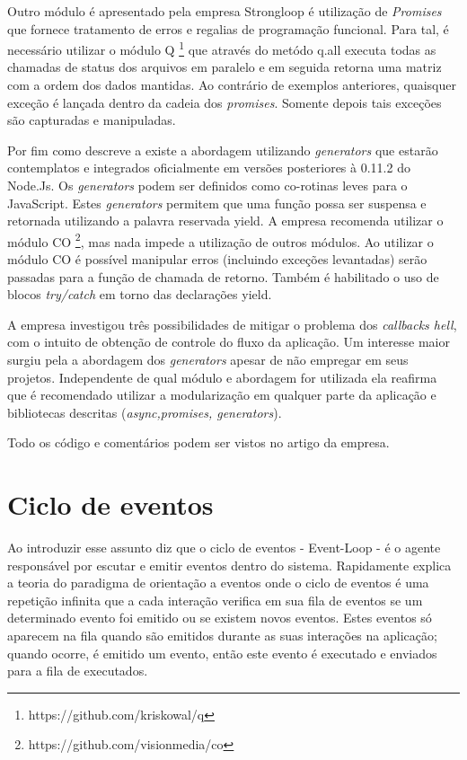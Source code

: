   Outro módulo é apresentado pela empresa Strongloop é utilização de \textit{Promises} que fornece tratamento de erros
  e regalias de programação funcional. Para tal, é necessário utilizar o módulo Q \footnote{https://github.com/kriskowal/q}
  que através do metódo q.all executa todas as chamadas de status dos arquivos em paralelo e em seguida retorna uma matriz
  com a ordem dos dados mantidas. Ao contrário de exemplos anteriores, quaisquer exceção é lançada dentro da cadeia dos
  \textit{promises}. Somente depois tais exceções são capturadas e manipuladas.
  
  Por fim como descreve a  existe a abordagem utilizando \textit{generators} que estarão
  contemplatos e integrados oficialmente em versões posteriores à 0.11.2 do Node.Js. Os \textit{generators} podem ser definidos
  como co-rotinas leves para o JavaScript. Estes \textit{generators} permitem que uma função possa ser suspensa e retornada
  utilizando a palavra reservada yield. A empresa recomenda utilizar o módulo CO \footnote{https://github.com/visionmedia/co},
  mas nada impede a utilização de outros módulos. Ao utilizar o módulo CO é possível manipular erros (incluindo exceções levantadas)
  serão passadas para a função de chamada de retorno. Também é habilitado o uso de blocos \textit{try/catch} em torno das 
  declarações yield.
  
  A empresa \cite{Strongloop:2013} investigou três possibilidades de mitigar o problema dos \textit{callbacks hell}, com o 
  intuito de obtenção de controle do fluxo da aplicação. Um interesse maior surgiu pela a abordagem dos \textit{generators}
  apesar de não empregar em seus projetos. Independente de qual módulo e abordagem for utilizada ela reafirma que é recomendado
  utilizar a modularização em qualquer parte da aplicação e bibliotecas descritas (\textit{async,promises, generators}).
  
  Todo os código e comentários podem ser vistos no artigo da empresa. \cite{Strongloop:2013}
  
\section{Ciclo de eventos}
\label{ciclo-de-eventos}
  
  Ao introduzir esse assunto \cite{Pereira:2013} diz que o ciclo de eventos - Event-Loop - 
  é o agente responsável por escutar e emitir eventos dentro do sistema. Rapidamente explica a teoria do paradigma 
  de orientação a eventos onde o ciclo de eventos é uma repetição infinita que a cada interação verifica em sua 
  fila de eventos se um determinado evento foi emitido ou se existem novos eventos. Estes eventos só aparecem na 
  fila quando são emitidos durante as suas interações na aplicação; quando ocorre, é emitido um evento, então este evento 
  é executado e enviados para a fila de executados.
  
